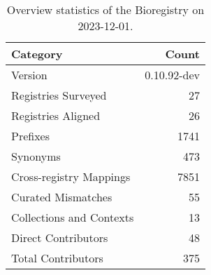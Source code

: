 \begin{table}
\caption{Overview statistics of the Bioregistry on 2023-12-01.}
\label{tab:bioregistry-summary}
\begin{tabular}{lr}
\toprule
Category & Count \\
\midrule
Version & 0.10.92-dev \\
Registries Surveyed & 27 \\
Registries Aligned & 26 \\
Prefixes & 1741 \\
Synonyms & 473 \\
Cross-registry Mappings & 7851 \\
Curated Mismatches & 55 \\
Collections and Contexts & 13 \\
Direct Contributors & 48 \\
Total Contributors & 375 \\
\bottomrule
\end{tabular}
\end{table}
